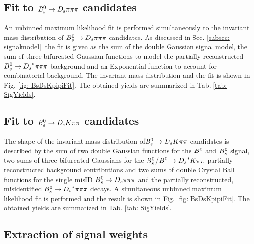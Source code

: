 \subsection{Fit to ${{B}^0_{s}}\rightarrow{\ensuremath{{D}_{s}}}{\ensuremath{\pi}}{\ensuremath{\pi}}{\ensuremath{\pi}}$ candidates}
\label{subsec: NormFit}

An unbinned maximum likelihood fit is performed simultaneously to the invariant mass distribution of ${{B}^0_{s}}\rightarrow{\ensuremath{{D}_{s}}}{\ensuremath{\pi}}{\ensuremath{\pi}}{\ensuremath{\pi}}$ candidates. 
As discussed in Sec. \ref{subsec: signalmodel}, the fit is given as the sum of the double Gaussian signal model, the sum of three bifurcated Gaussian functions to model the partially reconstructed ${{B}^0_{s}}\rightarrow{\ensuremath{{D}_{s}}}^{*}{\pi}{\pi}{\pi}$ background and an Exponential function to account for combinatorial background. The invariant mass distribution and the fit is shown in Fig. \ref{fig: BsDsKpipiFit}. 
The obtained yields are summarized in Tab. \ref{tab: SigYields}.




\subsection{Fit to ${{B}^0_{s}}\rightarrow{\ensuremath{{D}_{s}}}{\ensuremath{K}}{\ensuremath{\pi}}{\ensuremath{\pi}}$ candidates}
\label{subsec: SigFit}

The shape of the invariant mass distribution of${{B}^0_{s}}\rightarrow{\ensuremath{{D}_{s}}}{\ensuremath{K}}{\ensuremath{\pi}}{\ensuremath{\pi}}$ candidates is described by the sum of two double Gaussian functions for the ${{B}^0}$ and ${{B}^0_{s}}$ signal, 
two sums of three bifurcated Gaussians for the ${{B}^0_{s}}$/${{B}^0}\rightarrow{\ensuremath{{D}_{s}}}^{*}{K}{\pi}{\pi}$ partially reconstructed background contributions and 
two sums of double Crystal Ball functions for the single misID ${{B}^0_{s}}\rightarrow{\ensuremath{{D}_{s}}}{\ensuremath{\pi}}{\ensuremath{\pi}}{\ensuremath{\pi}}$ and the partially reconstructed, misidentified ${{B}^0_{s}}\rightarrow{\ensuremath{{D}_{s}}}^{*}{\pi}{\pi}{\pi}$ decays. 
A simultaneous unbinned maximum likelihood fit is performed and the result is shown in Fig. \ref{fig: BsDsKpipiFit}.
The obtained yields are summarized in Tab. \ref{tab: SigYields}.
 

\subsection{Extraction of signal weights}
\label{subsec: sWegihts}


